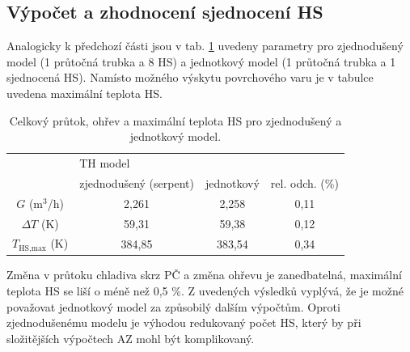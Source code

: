 \subsection{Výpočet a zhodnocení sjednocení HS}
Analogicky k předchozí části jsou v tab. \ref{tab:sjednoceni_hs} uvedeny parametry pro zjednodušený model (1 průtočná trubka a 8 HS) a jednotkový model (1 průtočná trubka a 1 sjednocená HS). Namísto možného výskytu povrchového varu je v tabulce uvedena maximální teplota HS.
\begin{table}[H]
	\centering
	\caption{Celkový průtok, ohřev a maximální teplota HS pro zjednodušený a jednotkový model.}
	\label{tab:sjednoceni_hs}
	\begin{tabular}{cccc}
		\hline
		& \multicolumn{2}{l}{TH model}          &                    \\
		& zjednodušený (serpent) & jednotkový   & rel. odch. (\%)    \\
		\hline \hline

		$G$ (m$^3$/h) & 2,261 & 2,258 & 0,11\\
		$\Delta T$ (K)                & 59,31                  & 59,38        & 0,12 \\
		$T_{\text{HS},\text{max}}$ (K)             & 384,85                 & 383,54       & 0,34\\
		\hline
	\end{tabular}
\end{table}
 Změna v průtoku chladiva skrz PČ a změna ohřevu je zanedbatelná, maximální teplota HS se liší o méně než 0,5 \%. Z uvedených výsledků vyplývá, že je možné považovat jednotkový model za způsobilý dalším výpočtům. Oproti zjednodušenému modelu je výhodou redukovaný počet HS, který by při složitějších výpočtech AZ mohl být komplikovaný.